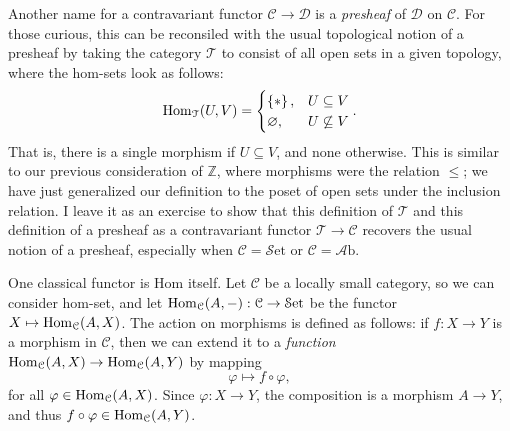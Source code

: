 \documentclass[11pt, letterpaper]{article}
\newcommand{\Set}{\mathcal{S}\mathrm{et}}
\begin{document}
Another name for a contravariant functor $\mathcal{C} \to \mathcal{D} $ is a \emph{presheaf} of $\mathcal{D} $ on $\mathcal{C} $. For those curious, this can be reconsiled with the usual topological notion of a presheaf by taking the category $\mathcal{T} $ to consist of all open sets in a given topology, where the hom-sets look as follows:
\[
	\operatorname{Hom}_{\mathcal{T} }(U, V) =
	\begin{cases}
		\left\{ * \right\} ,&U\subseteq V\\
		\varnothing ,&U\not\subseteq V
	\end{cases}
.\]
That is, there is a single morphism if $U\subseteq V$, and none otherwise. This is similar to our previous consideration of $\mathbb{Z} $, where morphisms were the relation $\leq $; we have just generalized our definition to the poset of open sets under the inclusion relation. I leave it as an exercise to show that this definition of $\mathcal{T} $ and this definition of a presheaf as a contravariant functor $\mathcal{T} \to \mathcal{C} $ recovers the usual notion of a presheaf, especially when $\mathcal{C} =\Set $ or $\mathcal{C} =\mathcal{A} \mathrm{b} $.

One classical functor is Hom itself. Let $\mathcal{C} $ be a locally small category, so we can consider hom-set, and let $\Hom_{\mathcal{C} }(A, -) : \mathcal{C}  \to \Set $ be the functor $X\mapsto \operatorname{Hom}_{\mathcal{C} }(A, X) $. The action on morphisms is defined as follows: if $f : X \to Y$ is a morphism in $\mathcal{C} $, then we can extend it to a \emph{function} $\operatorname{Hom}_{\mathcal{C} }(A, X) \to \operatorname{Hom}_{\mathcal{C} }(A, Y) $ by mapping
\[
	\varphi \mapsto f\circ \varphi ,
\]
for all $\varphi \in \operatorname{Hom}_{\mathcal{C} }(A, X) $. Since $\varphi : X \to Y$, the composition is a morphism $A\to Y$, and thus $f\circ \varphi \in \operatorname{Hom}_{\mathcal{C} }(A, Y) $.
\end{document}
